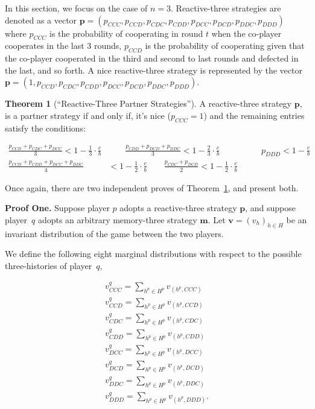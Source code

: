 \documentclass{article}
\theoremstyle{definition}
\newtheorem{theorem}{Theorem}[section]
\begin{document}
In this section, we focus on the case of $n=3$. Reactive-three strategies are
denoted as a vector $\mathbf{p}=(p_{CCC}, p_{CCD}, p_{CDC}, p_{CDD}, p_{DCC},
p_{DCD}, p_{DDC}, p_{DDD})$ where $p_{CCC}$ is the probability of cooperating in
round $t$ when the co-player cooperates in the last 3 rounds, $p_{CCD}$ is the
probability of cooperating given that the co-player cooperated in the third and
second to last rounds and defected in the last, and so forth. A nice
reactive-three strategy is represented by the vector $\mathbf{p}=(1, p_{CCD},
p_{CDC}, p_{CDD}, p_{DCC}, p_{DCD}, p_{DDC}, p_{DDD})$.

\begin{theorem}[``Reactive-Three Partner Strategies'']\label{theorem:reactive_three_partner_strategies}
A reactive-three strategy $\mathbf{p}$, is a partner strategy if and only if,
it's nice ($p_{CCC} = 1$) and the remaining entries satisfy the conditions:

\begin{align}\label{eq:three_bit_conditions}
  \frac{p_{CCD} + p_{CDC} + p_{DCC}}{3} < 1\!-\! \frac{1}{3} \cdot \frac{c}{b} & \qquad 
  \frac{p_{CDD} + p_{DCD} + p_{DDC}}{3} < 1\!-\! \frac{2}{3} \cdot \frac{c}{b} & \qquad 
  p_{DDD} < 1\!-\! \frac{c}{b} \\
  \frac{p_{CCD} + p_{CDD} + p_{DCC} + p_{DDC}}{4}  & < 1\!-\! \frac{1}{2} \cdot \frac{c}{b} 
  \qquad \frac{p_{CDC} + p_{DCD}}{2} < 1\!-\! \frac{1}{2} \cdot \frac{c}{b}
\end{align}
\end{theorem}

Once again, there are two independent proves of
Theorem~\ref{theorem:reactive_three_partner_strategies}, and present both.

{\bf Proof One.} Suppose player $p$ adopts a reactive-three strategy
$\mathbf{p}$, and suppose player~$q$ adopts an arbitrary memory-three strategy
$\mathbf{m}$. Let $\mathbf{v}=(v_h)_{h\in H}$ be an invariant distribution of
the game between the two players.

We define the following eight marginal distributions with respect to the possible
three-histories of player~$q$,

\begin{equation}
\begin{array}{l}
\displaystyle v^q_{CCC} = \sum_{h^p\in H^p} v_{(h^p,CCC)}\\
\displaystyle v^q_{CCD} = \sum_{h^p\in H^p} v_{(h^p,CCD)}\\
\displaystyle v^q_{CDC} = \sum_{h^p\in H^p} v_{(h^p,CDC)}\\
\displaystyle v^q_{CDD} = \sum_{h^p\in H^p} v_{(h^p,CDD)}\\
\displaystyle v^q_{DCC} = \sum_{h^p\in H^p} v_{(h^p,DCC)}\\
\displaystyle v^q_{DCD} = \sum_{h^p\in H^p} v_{(h^p,DCD)}\\
\displaystyle v^q_{DDC} = \sum_{h^p\in H^p} v_{(h^p,DDC)}\\
\displaystyle v^q_{DDD} = \sum_{h^p\in H^p} v_{(h^p,DDD)}.
\end{array}
\end{equation}
\end{document}
